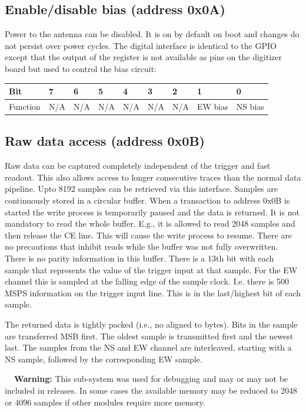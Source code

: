 \documentclass[a4paper,indent]{paper}
\newenvironment{warn}
{\par\begin{mdframed}[linewidth=2pt,linecolor=orange,backgroundcolor=orange!10]%
    \begin{list}{}{\leftmargin=0mm}\item[\bf\danger{}~~Warning: ]}
  {\end{list}\end{mdframed}\par}
\begin{document}
\subsection{Enable/disable bias (address 0x0A)}
Power to the antenna can be disabled. It is on by default on boot and changes do not persist over power cycles.
The digital interface is identical to the GPIO except that the output of the register is not available as pins on the digitizer board but used to control the bias circuit:
\begin{center}
  \begin{tabular}{|l|l|l|l|l|l|l|l|l|}
    \hline
    Bit & 7 & 6 & 5 & 4 & 3 & 2 & 1 & 0 \\
    \hline
    Function & N/A & N/A & N/A & N/A & N/A & N/A & EW bias & NS bias\\
    \hline
  \end{tabular}
\end{center}
  
\subsection{Raw data access (address 0x0B)}
Raw data can be captured completely independent of the trigger and fast readout.
This also allows access to longer consecutive traces than the normal data pipeline.
Upto 8192 samples can be retrieved via this interface.
Samples are continuously stored in a circular buffer. When a transaction to address 0x0B is started the write process is temporarily paused and the data is returned.
It is not mandatory to read the whole buffer. E.g., it is allowed to read 2048 samples and then release the CE line. This will cause the write process to resume.
There are no precautions that inhibit reads while the buffer was not fully overwritten. There is no parity information in this buffer.
There is a 13th bit with each sample that represents the value of the trigger input at that sample. For the EW channel this is sampled at the falling edge of the sample clock. I.e. there is 500 MSPS information on the trigger input line. This is in the last/highest bit of each sample.

The returned data is tightly packed (i.e., no aligned to bytes). Bits in the sample are transferred MSB first.
The oldest sample is transmitted first and the newest last.
The samples from the NS and EW channel are interleaved, starting with a NS sample, followed by the corresponding EW sample.

\begin{warn}
  This sub-system was used for debugging and may or may not be included in releases.
  In some cases the available memory may be reduced to 2048 or 4096 samples if other modules require more memory.
\end{warn}
\end{document}
